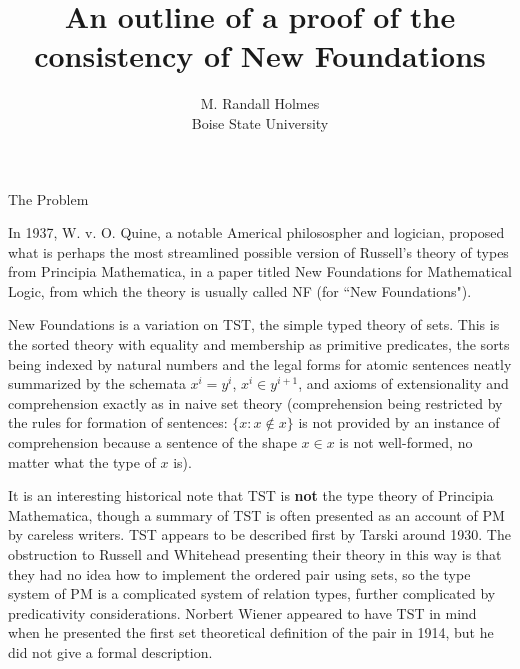 \documentclass{slides}
\author{M. Randall Holmes\\Boise State University}
\title{An outline of a proof of the consistency of New Foundations}
\begin{document}
\begin{slide}

\maketitle

\end{slide}

\begin{slide}


{\Large The Problem}

In 1937, W. v. O. Quine, a notable Americal philosospher and logician, proposed what is perhaps the most streamlined possible version of Russell's theory of types from Principia Mathematica, in a paper titled New Foundations for Mathematical Logic, from which the theory is usually called NF (for ``New Foundations").



\end{slide}

\begin{slide}

New Foundations is a variation on TST, the simple typed theory of sets.  This is the sorted theory with equality and membership as primitive predicates, the sorts being indexed by natural numbers and the legal forms for atomic sentences neatly summarized by the schemata $x^i = y^i$, $x^i \in y^{i+1}$, and axioms of extensionality and comprehension exactly as in naive set theory (comprehension being restricted by the rules for formation of sentences:  $\{x:x \not\in x\}$ is not provided by an instance of comprehension because a sentence of the shape
$x \in x$ is not well-formed, no matter what the type of $x$ is).

\end{slide}

\begin{slide}

It is an interesting historical note that TST is {\bf not} the type theory of Principia Mathematica, though a summary of TST is often presented as an account of PM by careless writers.  TST appears to be described first by  Tarski around 1930.  The obstruction to Russell and Whitehead presenting their theory in this way is that they had no idea how to implement the ordered pair using sets, so the type system of PM is a complicated system of relation types, further complicated by predicativity considerations.  Norbert Wiener appeared to have TST in mind when he presented the first set theoretical definition of the pair in 1914, but he did not give a formal description.

\end{slide}
\end{document}
